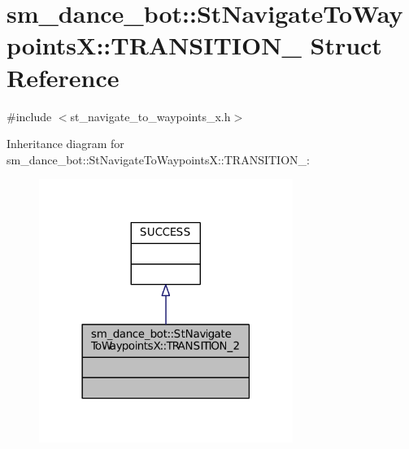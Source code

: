 \hypertarget{structsm__dance__bot_1_1StNavigateToWaypointsX_1_1TRANSITION__2}{}\section{sm\+\_\+dance\+\_\+bot\+:\+:St\+Navigate\+To\+WaypointsX\+:\+:T\+R\+A\+N\+S\+I\+T\+I\+O\+N\+\_ Struct Reference}
\label{structsm__dance__bot_1_1StNavigateToWaypointsX_1_1TRANSITION__2}


{\ttfamily \#include $<$st\+\_\+navigate\+\_\+to\+\_\+waypoints\+\_\+x.\+h$>$}



Inheritance diagram for sm\+\_\+dance\+\_\+bot\+:\+:St\+Navigate\+To\+WaypointsX\+:\+:T\+R\+A\+N\+S\+I\+T\+I\+O\+N\+\_\+:
\nopagebreak
\begin{figure}[H]
\begin{center}
\leavevmode
\includegraphics[width=234pt]{structsm__dance__bot_1_1StNavigateToWaypointsX_1_1TRANSITION__2__inherit__graph}
\end{center}
\end{figure}


